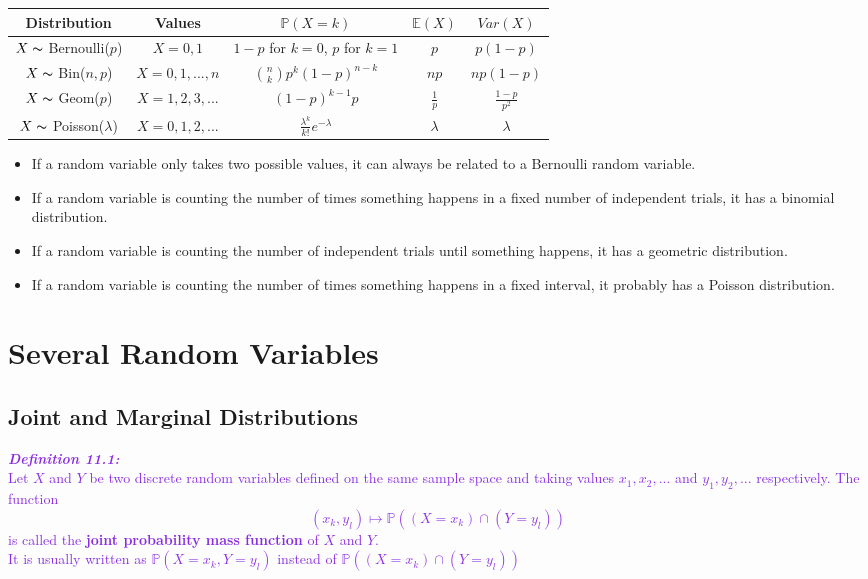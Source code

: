 \documentclass{report}
\newenvironment{cframed}[1][BlueViolet]
  {\begin{tcolorbox}[colframe=#1,colback=white]}
  {\end{tcolorbox}}
\begin{document}
\begin{table}[h!]
  \begin{center}
    \begin{tabular}{c|c|c|c|c} 
      Distribution & Values & $\mathbb{P}(X = k)$ & $\mathbb{E}(X)$ & $Var(X)$\\
      \hline
      $X \thicksim$ Bernoulli($p$) &  $X = 0,1$ & $1 - p$ for $k = 0$, $p$ for $k = 1$ & $p$ & $p(1-p)$\\
      $X \thicksim$ Bin($n,p$) & $X = 0,1,...,n$ & $\binom{n}{k} p^k (1-p)^{n-k}$ & $np$ & $np(1-p)$\\
      $X \thicksim$ Geom($p$) & $X = 1,2,3,...$ & $(1 - p)^{k-1}p$ & $\frac{1}{p}$ & $\frac{1-p}{p^2}$\\
      $X \thicksim$ Poisson($\lambda$) & $X = 0,1,2,...$ & $\frac{\lambda^k}{k!}e^{-\lambda}$ & $\lambda$ & $\lambda$
    \end{tabular}
  \end{center}
\end{table}

\begin{itemize}
    \item If a random variable only takes two possible values, it can always be related to a Bernoulli random variable.
    \item If a random variable is counting the number of times something happens in a fixed number of independent trials, it has a binomial distribution.
    \item If a random variable is counting the number of independent trials until something happens, it has a geometric distribution.
    \item If a random variable is counting the number of times something happens in a fixed interval, it probably has a Poisson distribution.
\end{itemize}

\chapter{Several Random Variables}
\section{Joint and Marginal Distributions}

\begin{cframed}
    \textcolor{BlueViolet}{\textbf{\textit{Definition 11.1:}}\\
    Let $X$ and $Y$ be two discrete random variables defined on the same sample space and taking values $x_1,x_2,...$ and $y_1,y_2,...$ respectively. The function
    \begin{equation}
        (x_k,y_l) \mapsto \mathbb{P}((X=x_k) \cap (Y=y_l))
    \end{equation}
    is called the \textbf{joint probability mass function} of $X$ and $Y$.\\
    It is usually written as $\mathbb{P}(X = x_k, Y = y_l)$ instead of $\mathbb{P}((X=x_k) \cap (Y=y_l))$}
\end{cframed}
\end{document}
